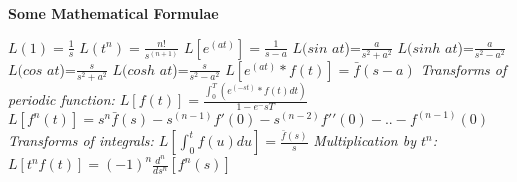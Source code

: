 \documentclass[a4paper,12pt]{article}
\begin{document}
\centerline{\textbf{ Some Mathematical Formulae}}

\vskip 0.2in
$L(1)=\frac{1}{s}$
\vskip 0.1in
$L(t^n)= {\frac{n!}{s^(n+1)}}$
\vskip 0.1in
$L[e^(at)]={\frac{1}{s-a}}$
\vskip 0.1in
$L(sin$ $at$)=${\frac{a}{s^2+a^2}}$
\vskip 0.1in
$L(sinh$ $at$)=$ \frac{a}{s^2-a^2}$
\vskip 0.1in
$L(cos$ $at$)=$\frac{s}{s^2+a^2}$
\vskip 0.1in
$L(cosh$ $at$)=$\frac{s}{s^2-a^2}$
\vskip 0.1in
$L[e^(at)*f(t)]=\bar f(s-a)$
\vskip 0.1in
\textit{\color{red} {Transforms of periodic function: }}  $L[f(t)]=\frac {\int_0^T (e^(-st)*f(t)dt)}{1-e^-sT}$
\vskip 0.1in
\textit{\color{red}{Transforms of derivatives:}} $L[f^n(t)]=s^n\bar f(s)-s^(n-1)f\prime(0)-s^(n-2)f\prime\prime(0)-..-f^(n-1)(0)$
\vskip 0.1in
\textit{\color{red} {Transforms of integrals: }}  $L[\int_0^t f(u)du]=\frac{\bar f(s)}{s}$
\vskip 0.1in
\textit{\color{blluw} {Multiplication by $t^n$: }}  $L[t^n f(t)]=(-1)^n \frac {d^n}{ds^n} [f^n(s)]$
\end{document}
